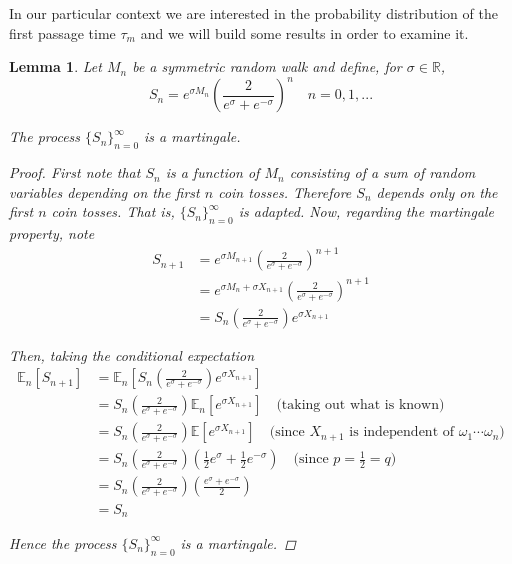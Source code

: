 \documentclass[12pt]{article}
\newtheorem{lemma}{Lemma}
\newlength\tindent
\renewcommand{\indent}{\hspace*{\tindent}}
\newcommand{\R}{\mathbb R}
\newcommand{\E}{\mathbb E}
\begin{document}
\indent In our particular context we are interested in the probability distribution of the first passage time $\tau_m$ and we will build some results in order to examine it.

\begin{lemma} Let $M_n$ be a symmetric random walk and define, for $\sigma \in \R$,
\begin{equation*}
	S_n = e^{\sigma M_n} \left( \frac{2}{e^\sigma + e^{-\sigma}} \right)^n \quad n = 0,1,...
\end{equation*}

The process $\{S_n\}^\infty_{n = 0}$ is a martingale.

\begin{proof} First note that $S_n$ is a function of $M_n$ consisting of a sum of random variables depending on the first $n$ coin tosses. Therefore $S_n$ depends only on the first $n$ coin tosses. That is, $\{S_n\}^\infty_{n = 0}$ is adapted. Now, regarding the martingale property, note
\begin{align*}
	S_{n + 1} &= e^{\sigma M_{n + 1}} \left( \frac{2}{e^\sigma + e^{-\sigma}} \right)^{n + 1} \\
	&= e^{\sigma M_n + \sigma X_{n + 1}} \left( \frac{2}{e^{\sigma} + e^{-\sigma}} \right)^{n + 1} \\
	&= S_n \left( \frac{2}{e^{\sigma} + e^{-\sigma}} \right) e^{\sigma X_{n + 1}}
\end{align*}

Then, taking the conditional expectation
\begin{align*}
	\E_n[S_{n + 1}] &= \E_n \left[ S_n \left( \frac{2}{e^\sigma + e^{-\sigma}} \right) e^{\sigma X_{n + 1}} \right] \\
	&= S_n \left( \frac{2}{e^\sigma + e^{-\sigma}} \right) \E_n \left[ e^{\sigma X_{n + 1}} \right] \quad \text{(taking out what is known)} \\
	&= S_n \left( \frac{2}{e^\sigma + e^{-\sigma}} \right) \E \left[ e^{\sigma X_{n + 1}} \right] \quad \text{(since $X_{n + 1}$ is independent of $\omega_1\cdots\omega_n$)} \\
	&= S_n \left( \frac{2}{e^\sigma + e^{-\sigma}} \right) \left( \frac{1}{2} e^\sigma + \frac{1}{2}e^{-\sigma} \right) \quad \text{(since $p = \frac{1}{2} = q$)} \\
	&= S_n \left( \frac{2}{e^\sigma + e^{-\sigma}} \right) \left( \frac{e^\sigma + e^{-\sigma}}{2} \right) \\
	&= S_n
\end{align*}

Hence the process $\{S_n\}^\infty_{n = 0}$ is a martingale.
\end{proof}
\end{lemma}
\end{document}
